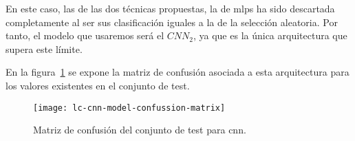 En este caso, las de las dos técnicas propuestas, la de \acp{mlp} ha sido descartada completamente al ser sus clasificación iguales a la de la selección aleatoria. Por tanto, el modelo que usaremos será el $CNN_2$, ya que es la única arquitectura que supera este límite.

En la figura~\ref{fig:lc-cnn-model-confussion-matrix} se expone la matriz de confusión asociada a esta arquitectura para los valores existentes en el conjunto de test.

\begin{figure}
	\centering
	\texttt{[image: lc-cnn-model-confussion-matrix]}
	\caption[Matriz de confusión del conjunto de test para \ac{cnn}]{Matriz de confusión del conjunto de test para \ac{cnn}.}
	\label{fig:lc-cnn-model-confussion-matrix}
\end{figure}
